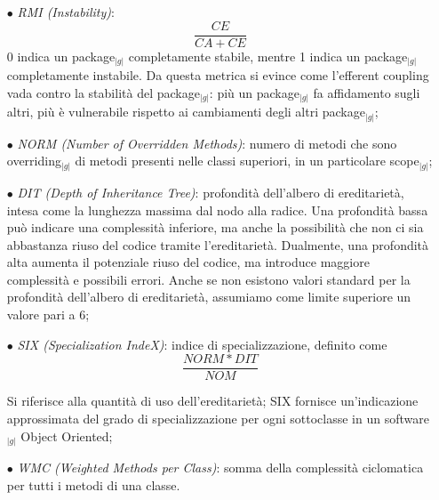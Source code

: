 {\begin{itemize}
\begin{itemize}
		      \item[$\bullet$] \textit{RMI (Instability)}:
			    \begin{equation}
				\frac{CE}{CA+CE}  
			    \end{equation} 
			     0 indica un package$_{|g|}$ completamente stabile, mentre 1 indica un package$_{|g|}$ completamente instabile. Da questa metrica si evince come l’efferent coupling vada 
			      contro la stabilità del package$_{|g|}$: più un package$_{|g|}$ fa affidamento sugli altri, più è vulnerabile rispetto ai cambiamenti degli altri package$_{|g|}$;
       
		      \item[$\bullet$] \textit{NORM (Number of Overridden Methods)}: numero di metodi che sono overriding$_{|g|}$ di metodi presenti nelle classi superiori, in un particolare 
			      scope$_{|g|}$;
 
		      \item[$\bullet$] \textit{DIT (Depth of Inheritance Tree)}: profondità dell’albero di ereditarietà, intesa come la lunghezza massima dal nodo alla radice. Una profondità bassa 
			      può indicare una complessità inferiore, ma anche la possibilità che non ci sia abbastanza riuso del codice tramite l’ereditarietà. Dualmente, una profondità 
			      alta aumenta il potenziale riuso del codice, ma introduce maggiore complessità e possibili errori. Anche se non esistono valori standard per la profondità 
			      dell’albero di ereditarietà, assumiamo come limite superiore un valore pari a 6;
 
		      \item[$\bullet$] \textit{SIX (Specialization IndeX)}: indice di specializzazione, definito come 
			     \begin{equation}
				 \frac{NORM*DIT}{NOM}
			     \end{equation}

			      Si riferisce alla quantità di uso dell’ereditarietà; SIX fornisce un’indicazione approssimata del grado di specializzazione per ogni sottoclasse in un 
			      software$_{|g|}$ Object Oriented;



		       \item[$\bullet$] \textit{WMC (Weighted Methods per Class)}: somma della complessità ciclomatica per tutti i metodi di una classe.
		\end{itemize}

\end{itemize}

}
